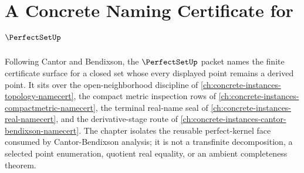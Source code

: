 \chapter{A Concrete Naming Certificate for $\PerfectSetUp$}
\label{ch:concrete-instances-perfect-set-namecert}

Following Cantor and Bendixson, the $\PerfectSetUp$ packet names the finite certificate surface for a closed set whose every displayed point remains a derived point. It sits over the open-neighborhood discipline of \autoref{ch:concrete-instances-topology-namecert}, the compact metric inspection rows of \autoref{ch:concrete-instances-compactmetric-namecert}, the terminal real-name seal of \autoref{ch:concrete-instances-real-namecert}, and the derivative-stage route of \autoref{ch:concrete-instances-cantor-bendixson-namecert}. The chapter isolates the reusable perfect-kernel face consumed by Cantor-Bendixson analysis; it is not a transfinite decomposition, a selected point enumeration, quotient real equality, or an ambient completeness theorem.

